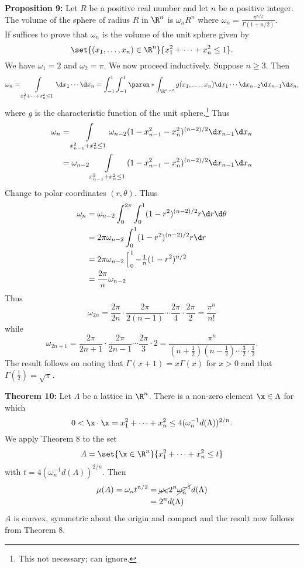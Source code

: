 \textbf{Proposition 9:} Let $R$ be a positive real number and let $n$ be a positive integer.  The volume of the sphere of radius $R$ in $\R^n$ is $\omega_n R^n$ where $\omega_n=\frac{\pi^{n/2}}{\Gamma(1+n/2)}$. \\
\pf If suffices to prove that $\omega_n$ is the volume of the unit sphere given by
\[ \set{(x_1,\dotsc,x_n)\in\R^n}{x_1^2+\dotsb+x_n^2\leq1} . \]
We have $\omega_1=2$ and $\omega_2=\pi$.  We now proceed inductively.  Suppose $n\geq3$.  Then
\[ \omega_n = \int\limits_{x_1^2+\dotsb+x_n^2\leq1}\d x_1\dotsm\d x_n = \int_{-1}^1\int_{-1}^1\paren*{\int_{\R^{n-2}} g(x_1,\dotsc,x_{n})\d x_1\dotsm\d x_{n-2}}\d x_{n-1}\d x_n , \]
where $g$ is the characteristic function of the unit sphere.\footnote{This not necessary; can ignore.}  Thus
\begin{align*}
\omega_n
&= \int\limits_{x_{n-1}^2+x_n^2\leq1}\omega_{n-2}(1-x_{n-1}^2-x_n^2)^{(n-2)/2}\d x_{n-1}\d x_n \\
&= \omega_{n-2}\int\limits_{x_{n-1}^2+x_n^2\leq1}(1-x_{n-1}^2-x_n^2)^{(n-2)/2}\d x_{n-1}\d x_n 
\end{align*}
Change to polar coordinates $(r,\theta)$. Thus
\begin{align*}
\omega_n &= \omega_{n-2} \int_0^{2\pi}\int_0^1 (1-r^2)^{(n-2)/2} r\d r\d\theta \\
&= 2\pi\omega_{n-2} \int_0^1 (1-r^2)^{(n-2)/2} r \d r \\
&= 2\pi\omega_{n-2} \left[ \vphantom{-\tfrac1n(1-r^2)^{n/2}} \right._0^1 {-\tfrac1n(1-r^2)^{n/2}} \\
&= \frac{2\pi}{n}\omega_{n-2}
\end{align*}
Thus
\[ \omega_{2n} = \frac{2\pi}{2n}\cdot\frac{2\pi}{2(n-1)}\dotsm\frac{2\pi}{4}\cdot\frac{2\pi}{2}=\frac{\pi^n}{n!} \]
while
\[ \omega_{2n+1} = \frac{2\pi}{2n+1}\cdot\frac{2\pi}{2n-1}\dotsm\frac{2\pi}{3}\cdot2 = \frac{\pi^n}{(n+\frac12)(n-\frac12)\dotsm\frac{3}{2}\cdot\frac{1}{2}} . \]
The result follows on noting that $\Gamma(x+1)=x\Gamma(x)$ for $x>0$ and that $\Gamma(\frac12)=\sqrt\pi$.

\textbf{Theorem 10:} Let $\Lambda$ be a lattice in $\R^n$.  There is a non-zero element $\x\in\Lambda$ for which 
\[ 0<\x\cdot\x=x_1^2+\dotsb+x_n^2 \leq 4(\omega^{-1}_n d(\Lambda))^{2/n} . \]
\pf We apply Theorem 8 to the set
\[ A = \set{\x\in\R^n}{x_1^2+\dotsb+x_n^2\leq t} \]
with $t=4(\omega^{-1}_n d(\Lambda))^{2/n}$.  Then
\begin{align*}
\mu(A) = \omega_n t^{n/2} &= \cancel{\omega_n} 2^n \cancel{\omega_n^{-1}} d(\Lambda) \\
&= 2^n d(\Lambda)
\end{align*}
$A$ is convex, symmetric about the origin and compact and the result now follows from Theorem 8.